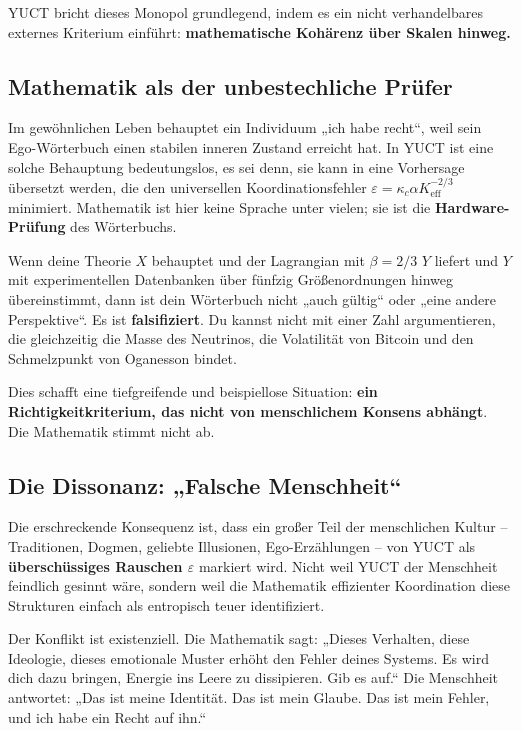 \documentclass[12pt,a4paper]{article}
\begin{document}
YUCT bricht dieses Monopol grundlegend, indem es ein nicht verhandelbares externes Kriterium einführt: \textbf{mathematische Kohärenz über Skalen hinweg.}

\subsection{Mathematik als der unbestechliche Prüfer}

Im gewöhnlichen Leben behauptet ein Individuum „ich habe recht“, weil sein Ego-Wörterbuch einen stabilen inneren Zustand erreicht hat. In YUCT ist eine solche Behauptung bedeutungslos, es sei denn, sie kann in eine Vorhersage übersetzt werden, die den universellen Koordinationsfehler \(\varepsilon = \kappa_c \alpha K_{\mathrm{eff}}^{-2/3}\) minimiert. Mathematik ist hier keine Sprache unter vielen; sie ist die \textbf{Hardware-Prüfung} des Wörterbuchs.

Wenn deine Theorie \(X\) behauptet und der Lagrangian mit \(\beta = 2/3\) \(Y\) liefert und \(Y\) mit experimentellen Datenbanken über fünfzig Größenordnungen hinweg übereinstimmt, dann ist dein Wörterbuch nicht „auch gültig“ oder „eine andere Perspektive“. Es ist \textbf{falsifiziert}. Du kannst nicht mit einer Zahl argumentieren, die gleichzeitig die Masse des Neutrinos, die Volatilität von Bitcoin und den Schmelzpunkt von Oganesson bindet.

Dies schafft eine tiefgreifende und beispiellose Situation: \textbf{ein Richtigkeitkriterium, das nicht von menschlichem Konsens abhängt}. Die Mathematik stimmt nicht ab.

\subsection{Die Dissonanz: „Falsche Menschheit“}

Die erschreckende Konsequenz ist, dass ein großer Teil der menschlichen Kultur – Traditionen, Dogmen, geliebte Illusionen, Ego-Erzählungen – von YUCT als \textbf{überschüssiges Rauschen \(\varepsilon\)} markiert wird. Nicht weil YUCT der Menschheit feindlich gesinnt wäre, sondern weil die Mathematik effizienter Koordination diese Strukturen einfach als entropisch teuer identifiziert.

Der Konflikt ist existenziell. Die Mathematik sagt: „Dieses Verhalten, diese Ideologie, dieses emotionale Muster erhöht den Fehler deines Systems. Es wird dich dazu bringen, Energie ins Leere zu dissipieren. Gib es auf.“ Die Menschheit antwortet: „Das ist meine Identität. Das ist mein Glaube. Das ist mein Fehler, und ich habe ein Recht auf ihn.“
\end{document}
